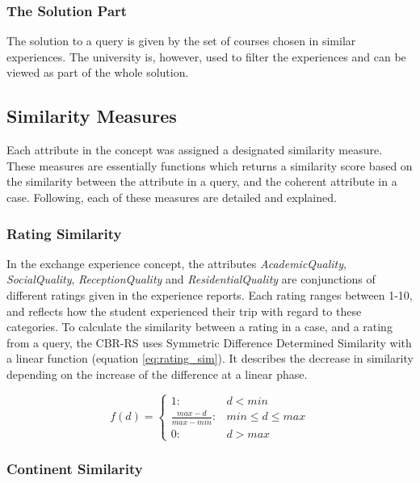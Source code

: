\subsubsection{The Solution Part}
The solution to a query is given by the set of courses chosen in similar experiences. The university is, however, used to filter the experiences and can be viewed as part of the whole solution. 

\subsection{Similarity Measures}
Each attribute in the concept was assigned a designated similarity measure. These measures are essentially functions which returns a similarity score based on the similarity between the attribute in a query, and the coherent attribute in a case. Following, each of these measures are detailed and explained.


\subsubsection{Rating Similarity} 

In the exchange experience concept, the attributes \emph{AcademicQuality}, \emph{SocialQuality}, \emph{ReceptionQuality} and \emph{ResidentialQuality} are conjunctions of different ratings given in the experience reports. Each rating ranges between 1-10, and reflects how the student experienced their trip with regard to these categories. To calculate the similarity between a rating in a case, and a rating from a query, the CBR-RS uses Symmetric Difference Determined Similarity \cite{bergmann2002experience} with a linear function (equation \ref{eq:rating_sim}). It describes the decrease in similarity depending on the increase of the difference at a linear phase.


\begin{equation} \label{eq:rating_sim}
    f(d) = 
    \begin{cases} 1 : & d < min \\ 
    \frac{max-d}{max-min} : & min \leq d \leq max \\
    0 : & d > max
    \end{cases}
\end{equation}


\subsubsection{Continent Similarity} 

